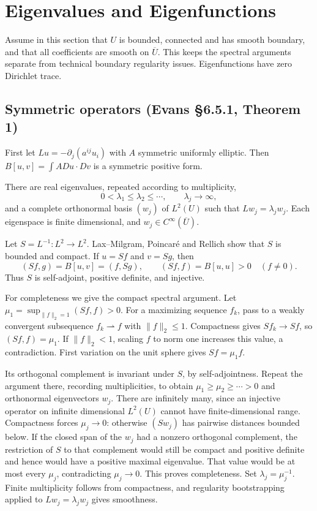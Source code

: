 \Needspace{65mm}
\section{Eigenvalues and Eigenfunctions}
\label{sec:6-5}
Assume in this section that $U$ is bounded, connected and has smooth
boundary, and that all coefficients are smooth on $\overline U$.
This keeps the spectral arguments separate from technical boundary
regularity issues. Eigenfunctions have zero Dirichlet trace.

\subsection{Symmetric operators (Evans \S6.5.1, Theorem 1)}
First let $Lu=-\partial_j(a^{ij}u_i)$ with $A$ symmetric uniformly elliptic.
Then $B[u,v]=\int A Du\cdot Dv$ is a symmetric positive form.
\begin{theorem}\label{thm:6-symmetric-spectrum}
There are real eigenvalues, repeated according to multiplicity,
\[
 0<\lambda_1\leq\lambda_2\leq\cdots,\qquad\lambda_j\longrightarrow\infty,
\]
and a complete orthonormal basis $(w_j)$ of $L^2(U)$ such that
$Lw_j=\lambda_jw_j$. Each eigenspace is finite dimensional, and
$w_j\in C^\infty(\overline U)$.
\end{theorem}
\begin{expandedproof}
Let $S=L^{-1}:L^2\to L^2$. Lax--Milgram, Poincar\'e and Rellich show
that $S$ is bounded and compact. If $u=Sf$ and $v=Sg$, then
\[
 (Sf,g)=B[u,v]=(f,Sg),\qquad
 (Sf,f)=B[u,u]>0\quad(f\ne0).
\]
Thus $S$ is self-adjoint, positive definite, and injective.

For completeness we give the compact spectral argument.
Let $\mu_1=\sup_{\|f\|_2=1}(Sf,f)>0$.
For a maximizing sequence $f_k$, pass to a weakly convergent subsequence
$f_k\rightharpoonup f$ with $\|f\|_2\leq1$.
Compactness gives $Sf_k\to Sf$, so $(Sf,f)=\mu_1$.
If $\|f\|_2<1$, scaling $f$ to norm one increases this value, a
contradiction. First variation on the unit sphere gives $Sf=\mu_1 f$.

Its orthogonal complement is invariant under $S$, by self-adjointness.
Repeat the argument there, recording multiplicities, to obtain
$\mu_1\geq\mu_2\geq\cdots>0$ and orthonormal eigenvectors $w_j$.
There are infinitely many, since an injective operator on infinite
dimensional $L^2(U)$ cannot have finite-dimensional range.
Compactness forces $\mu_j\to0$: otherwise $(Sw_j)$ has pairwise distances
bounded below.
If the closed span of the $w_j$ had a nonzero orthogonal complement,
the restriction of $S$ to that complement would still be compact and
positive definite and hence would have a positive maximal eigenvalue.
That value would be at most every $\mu_j$, contradicting $\mu_j\to0$.
This proves completeness. Set $\lambda_j=\mu_j^{-1}$.
Finite multiplicity follows from compactness, and regularity bootstrapping
applied to $Lw_j=\lambda_jw_j$ gives smoothness.
\end{expandedproof}
\Needspace{45mm}

